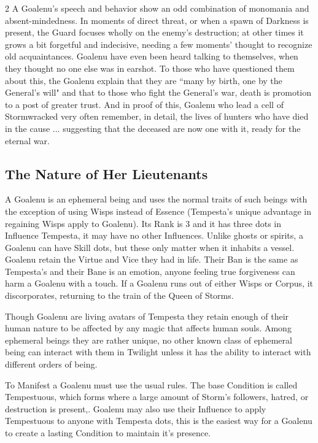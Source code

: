 \begin{multicols}{2}
A Goalenu's speech and behavior show an odd combination of monomania and absent-mindedness. In moments of direct threat, or when a spawn of Darkness is present, the Guard focuses wholly on the enemy's destruction; at other times it grows a bit forgetful and indecisive, needing a few moments' thought to recognize old acquaintances. Goalenu have even been heard talking to themselves, when they thought no one else was in earshot. To those who have questioned them about this, the Goalenu explain that they are \textquotedblleft many by birth, one by the General's will" and that to those who fight the General's war, death is promotion to a post of greater trust. And in proof of this, Goalenu who lead a cell of Stormwracked very often remember, in detail, the lives of hunters who have died in the cause ... suggesting that the deceased are now one with it, ready for the eternal war. 

\subsection*{The Nature of Her Lieutenants}

A Goalenu is an ephemeral being and uses the normal traits of such beings with the exception of using Wisps instead of Essence (Tempesta's unique advantage in regaining Wisps apply to Goalenu). Its Rank is 3 and it has three dots in Influence Tempesta, it may have no other Influences. Unlike ghosts or spirits, a Goalenu can have Skill dots, but these only matter when it inhabits a vessel. Goalenu retain the Virtue and Vice they had in life. Their Ban is the same as Tempesta's and their Bane is an emotion, anyone feeling true forgiveness can harm a Goalenu with a touch. If a Goalenu runs out of either Wisps or Corpus, it discorporates, returning to the train of the Queen of Storms. 

Though Goalenu are living avatars of Tempesta they retain enough of their human nature to be affected by any magic that affects human souls. Among ephemeral beings they are rather unique, no other known class of ephemeral being can interact with them in Twilight unless it has the ability to interact with different orders of being. 

To Manifest a Goalenu must use the usual rules. The base Condition is called Tempestuous, which forms where a large amount of Storm's followers, hatred, or destruction is present,. Goalenu may also use their Influence to apply Tempestuous to anyone with Tempesta dots, this is the easiest way for a Goalenu to create a lasting Condition to maintain it's presence. 


\end{multicols}
